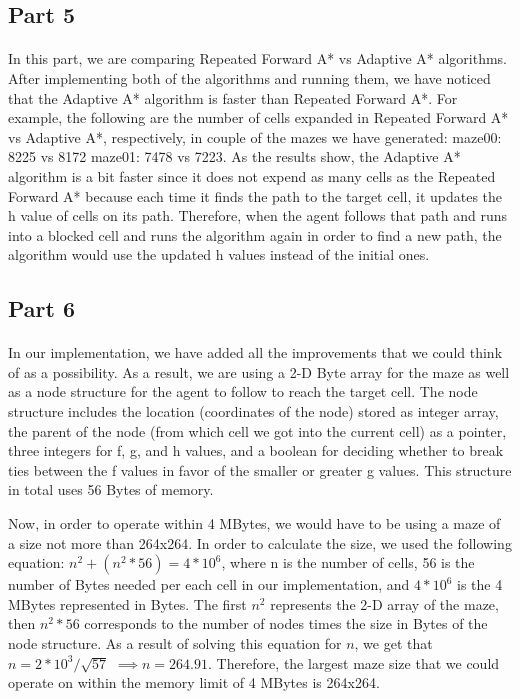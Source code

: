 \documentclass{article}
\begin{document}
\subsection*{Part 5}
\paragraph*{}
In this part, we are comparing Repeated Forward A* vs Adaptive A* algorithms. After implementing both of the algorithms and running them, we have noticed that the Adaptive A* algorithm is faster than Repeated Forward A*. For example, the following are the number of cells expanded in Repeated Forward A* vs Adaptive A*, respectively, in couple of the mazes we have generated: maze00: 8225 vs 8172 maze01: 7478 vs 7223. As the results show, the Adaptive A* algorithm is a bit faster since it does not expend as many cells as the Repeated Forward A* because each time it finds the path to the target cell, it updates the h value of cells on its path. Therefore, when the agent follows that path and runs into a blocked cell and runs the algorithm again in order to find a new path, the algorithm would use the updated h values instead of the initial ones.\par

\subsection*{Part 6}
\paragraph*{}
In our implementation, we have added all the improvements that we could think of as a possibility. As a result, we are using a 2-D Byte array for the maze as well as a node structure for the agent to follow to reach the target cell. The node structure includes the location (coordinates of the node) stored as integer array, the parent of the node (from which cell we got into the current cell) as a pointer, three integers for f, g, and h values, and a boolean for deciding whether to break ties between the f values in favor of the smaller or greater g values. This structure in total uses 56 Bytes of memory.\par
Now, in order to operate within 4 MBytes, we would have to be using a maze of a size not more than 264x264. In order to calculate the size, we used the following equation: \(n^2 + (n^2*56) = 4*10^6\), where n is the number of cells, 56 is the number of Bytes needed per each cell in our implementation, and \(4*10^6\) is the 4 MBytes represented in Bytes. The first \(n^2\) represents the 2-D array of the maze, then \(n^2*56\) corresponds to the number of nodes times the size in Bytes of the node structure. As a result of solving this equation for \(n\), we get that \(n=2*10^3/\sqrt{57}\) \(\implies n=264.91\). Therefore, the largest maze size that we could operate on within the memory limit of 4 MBytes is 264x264.\par
\end{document}
